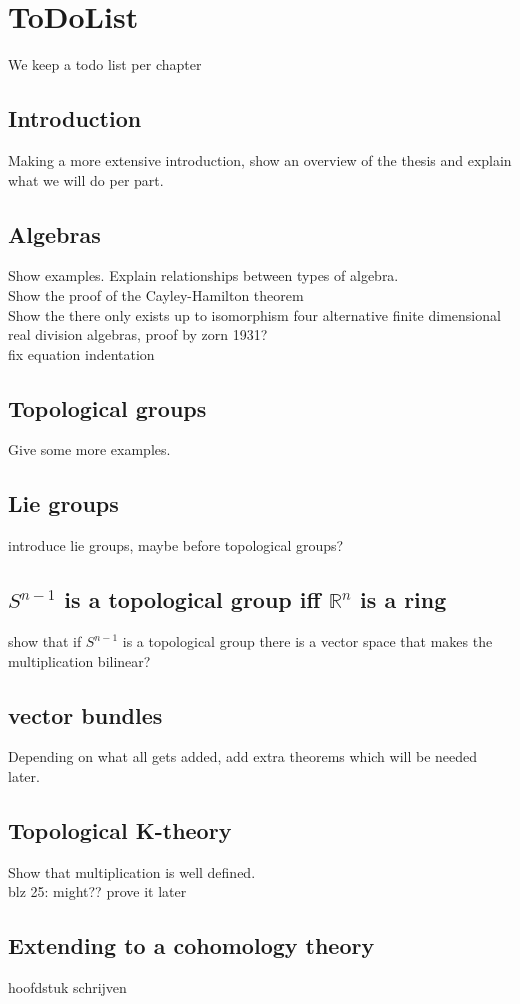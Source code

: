 \documentclass{report}
\begin{document}
\chapter{ToDoList}
We keep a todo list per chapter
\section{Introduction}
Making a more extensive introduction, show an overview of the thesis and explain what we will do per part.
\section{Algebras}
Show examples. Explain relationships between types of algebra.
\\Show the proof of the Cayley-Hamilton theorem
\\Show the there only exists up to isomorphism four alternative finite dimensional real division algebras, proof by zorn 1931?
\\fix equation indentation
\section{Topological groups}
Give some more examples.
\section{Lie groups}
introduce lie groups, maybe before topological groups?
\section{$S^ {n-1}$ is a topological group iff $\mathbb{R}^n$ is a ring}
show that if $S^{n-1}$ is a topological group there is a vector space that makes the multiplication bilinear?
\section{vector bundles}
Depending on what all gets added, add extra theorems which will be needed later.
\section{Topological K-theory}
Show that multiplication is well defined.
\\blz 25: might?? prove it later

\section{Extending to a cohomology theory}
hoofdstuk schrijven
\end{document}
